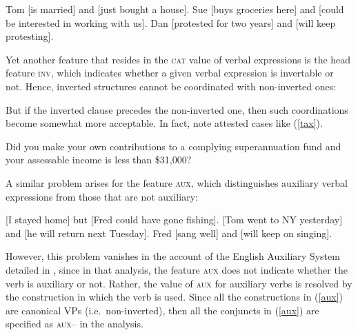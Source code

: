 {\eal
\label{vform}
\zl



\eal
\label{vform2}
\ex Tom [is married] and [just bought  a house].
\ex Sue [buys groceries here] and [could be interested in working with us].
\ex Dan [protested for two years] and [will keep protesting].
\zl

Yet another feature that resides in the \textsc{cat} value of verbal expressions is the head feature \textsc{inv}, which indicates whether a given verbal expression is invertable or not. Hence, inverted structures cannot be coordinated with non-inverted ones:


\eal
{}
\zl

\eal
{}
\zl

\noindent
But if the inverted clause precedes the non-inverted one, then such coordinations become somewhat more acceptable. In fact,  \citet[1332--1333]{rodney} note attested cases like 
(\ref{tax}).

\begin{exe}
\ex Did you make your own contributions to a complying superannuation fund and
your assessable income is less than \$31,000?\label{tax}
\end{exe}

\noindent
A similar problem arises for the feature \textsc{aux}, which distinguishes auxiliary verbal expressions from those that
are not auxiliary:

\eal
\label{aux}
\ex {}[I stayed home]\sub{\aux $-$} but [Fred could have gone fishing]\sub{\aux $+$}.
\ex {}[Tom went to NY yesterday]\sub{\aux $-$} and [he will return next Tuesday]\sub{\aux $+$}.
\ex Fred [sang well]\sub{\aux $-$} and [will keep on singing]\sub{\aux $+$}.
\zl

\noindent
However, this problem vanishes in the account of the English Auxiliary System detailed in \citet{SagEtAl20}, since in that analysis,
the feature \textsc{aux} does not indicate whether the verb is auxiliary or not. Rather, the value of \textsc{aux} for auxiliary verbs is resolved by the construction in which the verb is used. Since all the constructions in (\ref{aux}) are canonical VPs (i.e.\ non-inverted), then 
all the conjuncts in (\ref{aux}) are specified as \textsc{aux--} in
the \citet{SagEtAl20} analysis.




}
